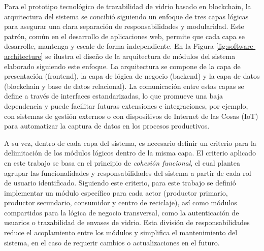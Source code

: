 Para el prototipo tecnológico de trazabilidad de vidrio basado en blockchain, la arquitectura del sistema se concibió siguiendo un enfoque de tres capas lógicas para asegurar una clara separación de responsabilidades y modularidad. Este patrón, común en el desarrollo de aplicaciones web, permite que cada capa se desarrolle, mantenga y escale de forma independiente. En la Figura \ref{fig:software-architecture} se ilustra el diseño de la arquitectura de módulos del sistema elaborado siguiendo este enfoque. La arquitectura se compone de la capa de presentación (frontend), la capa de lógica de negocio (backend) y la capa de datos (blockchain y base de datos relacional). La comunicación entre estas capas se define a través de interfaces estandarizadas, lo que promueve una baja dependencia y puede facilitar futuras extensiones e integraciones, por ejemplo, con sistemas de gestión externos o con dispositivos de Internet de las Cosas (IoT) para automatizar la captura de datos en los procesos productivos.

A su vez, dentro de cada capa del sistema, es necesario definir un criterio para la delimitación de los módulos lógicos dentro de la misma capa. El criterio aplicado en este trabajo se basa en el principio de \textit{cohesión funcional}, el cual plantea agrupar las funcionalidades y responsabilidades del sistema a partir de cada rol de usuario identificado. Siguiendo este criterio, para este trabajo se definió implementar un módulo específico para cada actor (productor primario, productor secundario, consumidor y centro de reciclaje), así como módulos compartidos para la lógica de negocio transversal, como la autenticación de usuarios o trazabilidad de envases de vidrio. Esta división de responsabilidades reduce el acoplamiento entre los módulos y simplifica el mantenimiento del sistema, en el caso de requerir cambios o actualizaciones en el futuro.

